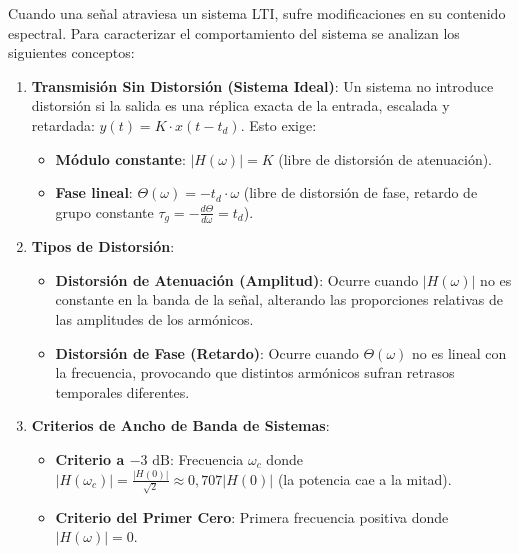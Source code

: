 \begin{tcolorbox}[cajaResumen, title={Fundamentos Teóricos: Sesión 3}]
Cuando una señal atraviesa un sistema LTI, sufre modificaciones en su contenido espectral. Para caracterizar el comportamiento del sistema se analizan los siguientes conceptos:

\begin{enumerate}[leftmargin=*]
    \item \textbf{Transmisión Sin Distorsión (Sistema Ideal)}:
    Un sistema no introduce distorsión si la salida es una réplica exacta de la entrada, escalada y retardada: $y(t) = K \cdot x(t - t_d)$. Esto exige:
    \begin{itemize}
        \item \textbf{Módulo constante}: $|H(\omega)| = K$ (libre de distorsión de atenuación).
        \item \textbf{Fase lineal}: $\Theta(\omega) = -t_d \cdot \omega$ (libre de distorsión de fase, retardo de grupo constante $\tau_g = -\frac{d\Theta}{d\omega} = t_d$).
    \end{itemize}

    \item \textbf{Tipos de Distorsión}:
    \begin{itemize}
        \item \textbf{Distorsión de Atenuación (Amplitud)}: Ocurre cuando $|H(\omega)|$ no es constante en la banda de la señal, alterando las proporciones relativas de las amplitudes de los armónicos.
        \item \textbf{Distorsión de Fase (Retardo)}: Ocurre cuando $\Theta(\omega)$ no es lineal con la frecuencia, provocando que distintos armónicos sufran retrasos temporales diferentes.
    \end{itemize}

    \item \textbf{Criterios de Ancho de Banda de Sistemas}:
    \begin{itemize}
        \item \textbf{Criterio a $-3\text{ dB}$}: Frecuencia $\omega_c$ donde $|H(\omega_c)| = \frac{|H(0)|}{\sqrt{2}} \approx 0{,}707 |H(0)|$ (la potencia cae a la mitad).
        \item \textbf{Criterio del Primer Cero}: Primera frecuencia positiva donde $|H(\omega)| = 0$.
    \end{itemize}
\end{enumerate}
\end{tcolorbox}

